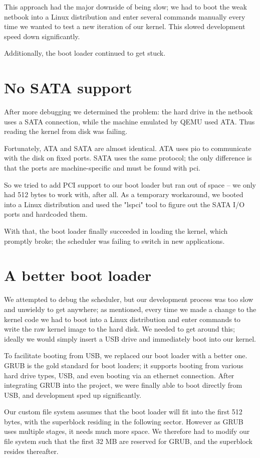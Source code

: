 \documentclass{report}
\begin{document}
This approach had the major downside of being slow; we had to boot the weak
netbook into a Linux distribution and enter several commands manually every
time we wanted to test a new iteration of our kernel. This slowed development
speed down significantly.

Additionally, the boot loader continued to get stuck.


\section{No SATA support}
After more debugging we determined the problem: the hard drive in the netbook
uses a SATA connection, while the machine emulated by QEMU used ATA. Thus
reading the kernel from disk was failing.

Fortunately, ATA and SATA are almost identical. ATA uses \gls{pio} to
communicate with the disk on fixed ports. SATA uses the same protocol; the
only difference is that the ports are machine-specific and must be found with
\gls{pci}.

So we tried to add PCI support to our boot loader but ran out of space -- we
only had 512 bytes to work with, after all. As a temporary workaround, we
booted into a Linux distribution and used the "lspci" tool to figure out the
SATA I/O ports and hardcoded them. 

With that, the boot loader finally succeeded in loading the kernel, which
promptly broke; the scheduler was failing to switch in new applications.


\section{A better boot loader}
We attempted to debug the scheduler, but our development process was too slow
and unwieldy to get anywhere; as mentioned, every time we made a change to the
kernel code we had to boot into a Linux distribution and enter commands to
write the raw kernel image to the hard disk. We needed to get around this;
ideally we would simply insert a USB drive and immediately boot into our
kernel. 

To facilitate booting from USB, we replaced our boot loader with a better one.
GRUB is the gold standard for boot loaders; it supports booting from various
hard drive types, USB, and even booting via an ethernet connection. After
integrating GRUB into the project, we were finally able to boot directly from
USB, and development sped up significantly.

Our custom file system assumes that the boot loader will fit into the first
512 bytes, with the superblock residing in the following sector. However as
GRUB uses multiple stages, it needs much more space. We therefore had to
modify our file system such that the first 32 MB are reserved for GRUB, and
the superblock resides thereafter.
\end{document}
